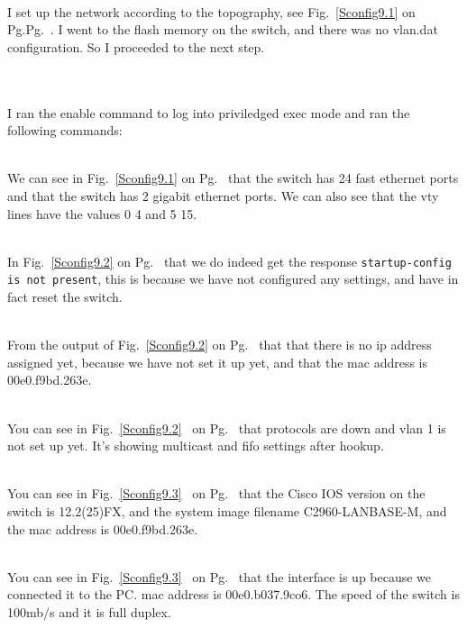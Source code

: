 \documentclass[../EngineeringJournal_CDavis.tex]{subfiles}
\begin{document}
\\
I set up the network according to the topography, see
Fig.~\ref{Sconfig9.1} on Pg.Pg.~\pageref{Sconfig9.1}. I went to the flash memory
on the switch, and there was no vlan.dat configuration. So I proceeded to the
next step. 


\noindent{}\\

\\
I ran the enable command to log into priviledged
exec mode and ran the following commands:


\\
We can see in Fig.~\ref{Sconfig9.1} on
Pg.~\pageref{Sconfig9.1} that the switch has 24 fast ethernet ports
and that the switch has 2 gigabit ethernet ports. We can also see that the
vty lines have the values 0 4 and 5 15.


\\
In Fig.~\ref{Sconfig9.2} on Pg.~\pageref{Sconfig9.2}
that we do indeed get the 
response {\scriptsize{\verb$startup-config is not present$}\normalsize}, 
this is because we have not configured any settings, and
have in fact reset the switch.


\\
From the output of Fig.~\ref{Sconfig9.2} on
Pg.~\pageref{Sconfig9.2} that that there is no ip address assigned yet, because
we have not set it up yet, and that the mac address is 00e0.f9bd.263e.


\\
You can see in Fig.~\ref{Sconfig9.2}~ 
on Pg.~\pageref{Sconfig9.2} that protocols are down and vlan 1 is not set up yet.
It's showing multicast and fifo settings after hookup.


\\
You can see in Fig.~\ref{Sconfig9.3}~ 
on Pg.~\pageref{Sconfig9.3} that the Cisco IOS version on the switch is
12.2(25)FX, and the system image filename C2960-LANBASE-M, and the mac address
is 00e0.f9bd.263e.


\\
You can see in Fig.~\ref{Sconfig9.3}~ 
on Pg.~\pageref{Sconfig9.3} that the interface is up because we connected it to
the PC. mac address is 00e0.b037.9co6. The speed of the switch is 100mb/s and
it is full duplex. 
\end{document}
